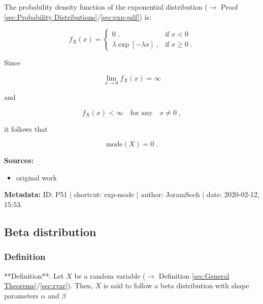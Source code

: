\documentclass[a4paper,12pt,twoside]{book}
\begin{document}
The probability density function of the exponential distribution ($\rightarrow$ Proof \ref{sec:Probability Distributions}/\ref{sec:exp-pdf}) is:

\begin{equation} \label{eq:exp-mode-exp-pdf}
f_X(x) = \left\{
\begin{array}{rl}
0 \; , & \text{if} \; x < 0 \\
\lambda \exp[-\lambda x] \; , & \text{if} \; x \geq 0 \; .
\end{array}
\right.
\end{equation}

Since

\begin{equation} \label{eq:exp-mode-exp-pdf-eq0}
\lim_{x \to 0} f_X(x) = \infty
\end{equation}

and

\begin{equation} \label{eq:exp-mode-exp-pdf-neq0}
f_X(x) < \infty \quad \text{for any} \quad x \neq 0 \; ,
\end{equation}

it follows that

\begin{equation} \label{eq:exp-mode-exp-mode-qed}
\mathrm{mode}(X) = 0 \; .
\end{equation}


\vspace{1em}
\textbf{Sources:}
\begin{itemize}
\item original work\end{itemize}


\vspace{1em}
\textbf{Metadata:} ID: P51 | shortcut: exp-mode | author: JoramSoch | date: 2020-02-12, 15:53.
\vspace{1em}



\subsection{Beta distribution}

\subsubsection[\textit{Definition}]{Definition} \label{sec:beta}
\setcounter{equation}{0}

**Definition**: Let $X$ be a random variable ($\rightarrow$ Definition \ref{sec:General Theorems}/\ref{sec:rvar}). Then, $X$ is said to follow a beta distribution with shape parameters $\alpha$ and $\beta$
\end{document}
